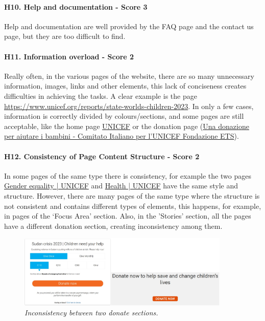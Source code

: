 \newline
\newline \paragraph{H10. Help and documentation - Score 3}  \label{subsec:H10}	Help and documentation are well provided by the FAQ page and the contact us page, but they are too difficult to find.
\newline
\newline \paragraph{H11. Information overload - Score 2}  \label{subsec:H11}	Really often, in the various pages of the website, there are so many unnecessary information, images, links and other elements, this lack of conciseness creates difficulties in achieving the tasks. A clear example is the page \href{https://www.unicef.org/reports/state-worlds-children-2023}{https://www.unicef.org/reports/state-worlds-children-2023}.
\newline In only a few cases, information is correctly divided by colours/sections, and some pages are still acceptable, like the home page \href{https://www.unicef.org/}{UNICEF} or the donation page (\href{https://donazioni.unicef.it}{Una donazione per aiutare i bambini - Comitato Italiano per l'UNICEF Fondazione ETS}).
\newline
\newline \paragraph{H12. Consistency of Page Content Structure - Score 2}  \label{subsec:H12}	In some pages of the same type there is consistency, for example the two pages \href{https://www.unicef.org/gender-equality}{Gender equality | UNICEF} and \href{https://www.unicef.org/health}{Health | UNICEF} have the same style and structure.
\newline However, there are many pages of the same type where the structure is not consistent and contains different types of elements, this happens, for example, in pages of the ‘Focus Area’ section.
\newline Also, in the 'Stories' section, all the pages have a different donation section, creating inconsistency among them.
\begin{figure}[!h]
	\begin{center}
		\includegraphics[width=0.9\textwidth]{FinalScores16.jpg}
		\captionsetup{font=small}
		\caption{\textit{Inconsistency between two donate sections.}}
	\end{center}
\end{figure}
